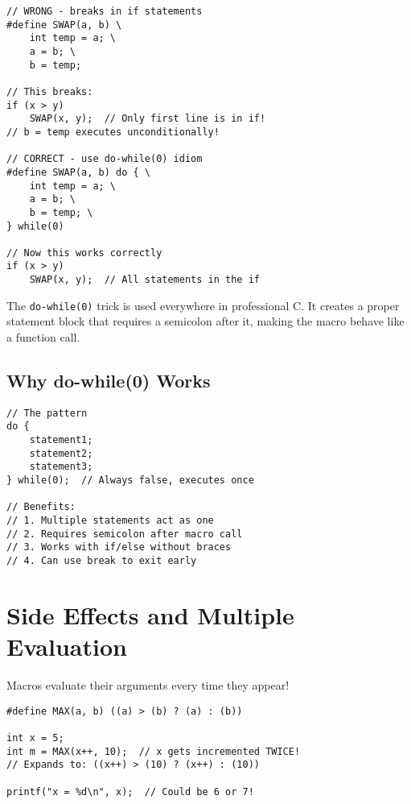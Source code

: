 \begin{lstlisting}
// WRONG - breaks in if statements
#define SWAP(a, b) \
    int temp = a; \
    a = b; \
    b = temp;

// This breaks:
if (x > y)
    SWAP(x, y);  // Only first line is in if!
// b = temp executes unconditionally!

// CORRECT - use do-while(0) idiom
#define SWAP(a, b) do { \
    int temp = a; \
    a = b; \
    b = temp; \
} while(0)

// Now this works correctly
if (x > y)
    SWAP(x, y);  // All statements in the if
\end{lstlisting}

\begin{notebox}
The \texttt{do-while(0)} trick is used everywhere in professional C. It creates a proper statement block that requires a semicolon after it, making the macro behave like a function call.
\end{notebox}

\subsection{Why do-while(0) Works}

\begin{lstlisting}
// The pattern
do {
    statement1;
    statement2;
    statement3;
} while(0);  // Always false, executes once

// Benefits:
// 1. Multiple statements act as one
// 2. Requires semicolon after macro call
// 3. Works with if/else without braces
// 4. Can use break to exit early
\end{lstlisting}

\section{Side Effects and Multiple Evaluation}

\begin{warningbox}
Macros evaluate their arguments every time they appear!
\end{warningbox}

\begin{lstlisting}
#define MAX(a, b) ((a) > (b) ? (a) : (b))

int x = 5;
int m = MAX(x++, 10);  // x gets incremented TWICE!
// Expands to: ((x++) > (10) ? (x++) : (10))

printf("x = %d\n", x);  // Could be 6 or 7!
\end{lstlisting}

